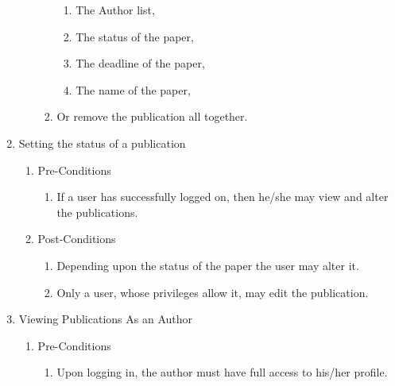 \documentclass[hidelinks,a4paper,12pt]{article}
\begin{document}
\begin{enumerate}
\begin{enumerate}
\begin{enumerate}
				\begin{enumerate}
					\item  The Author list,
					
					\item  The status of the paper,
					
					\item  The deadline of the paper,
					
					\item  The name of the paper,
				\end{enumerate}
				
				\item  Or remove the publication all together.
			\end{enumerate}
		\end{enumerate}
		
		\noindent 
		
		\noindent 
		
		\item  Setting the status of a publication
		
		\begin{enumerate}
			\item  Pre-Conditions
			
			\begin{enumerate}
				\item  If a user has successfully logged on, then he/she may view and alter the publications.
			\end{enumerate}
			
			\item  Post-Conditions
			
			\begin{enumerate}
				\item  Depending upon the status of the paper the user may alter it.
				
				\item  Only a user, whose privileges allow it, may edit the publication. 
			\end{enumerate}
		\end{enumerate}
		
		\noindent  
		
		\item  Viewing Publications As an Author
		
		\begin{enumerate}
			\item  Pre-Conditions
			
			\begin{enumerate}
				\item  Upon logging in, the author must have full access to his/her profile.
				

\end{enumerate}
\end{enumerate}
\end{enumerate}
\end{document}
